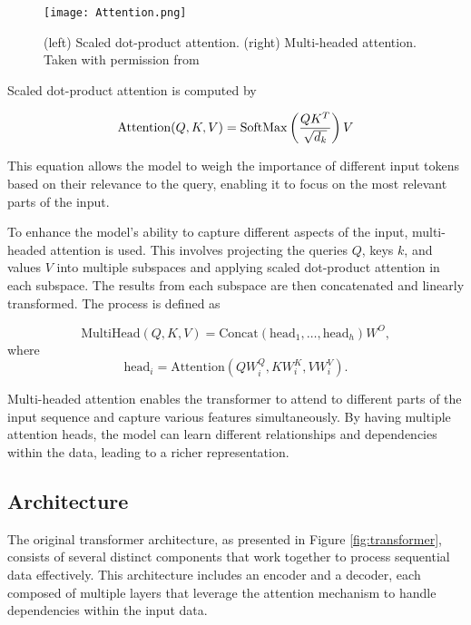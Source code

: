 \documentclass[../../thesis.tex]{subfiles}
\begin{document}
\begin{figure}[h]
    \texttt{[image: Attention.png]}
    \centering 
    \caption{(left) Scaled dot-product attention. (right) Multi-headed attention. Taken with permission from \cite{vaswani2023attention}}
    \label{fig:attention}
\end{figure}

Scaled dot-product attention is computed by 

\begin{equation}
    \text{Attention}(Q,K,V) = \operatorname{SoftMax} \left(\frac{QK^T}{\sqrt{d_k}}\right)V
\end{equation}

This equation allows the model to weigh the importance of different input tokens based on their relevance to the query, enabling it to focus on the most relevant parts of the input.\newline



To enhance the model's ability to capture different aspects of the input, multi-headed attention is used. This involves projecting the queries $Q$, keys $k$, and values $V$ into multiple subspaces and applying scaled dot-product attention in each subspace. The results from each subspace are then concatenated and linearly transformed. The process is defined as

\begin{equation}
    \text{MultiHead}(Q,K,V) = \text{Concat}(\text{head}_1,\dots, \text{head}_h)W^O,
\end{equation}
where
\begin{equation}
    \text{head}_i = \text{Attention}(QW_i^Q,KW_i^K,VW_i^V). 
\end{equation}

Multi-headed attention enables the transformer to attend to different parts of the input sequence and capture various features simultaneously. By having multiple attention heads, the model can learn different relationships and dependencies within the data, leading to a richer representation.

\subsection{Architecture}

The original transformer architecture, as presented in Figure \ref{fig:transformer}, consists of several distinct components that work together to process sequential data effectively. This architecture includes an encoder and a decoder, each composed of multiple layers that leverage the attention mechanism to handle dependencies within the input data.\newline
\end{document}
